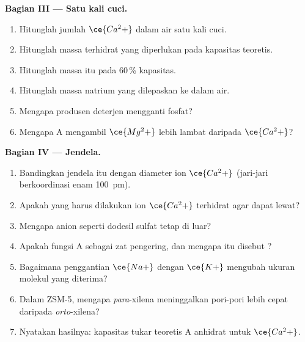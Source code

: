 \begin{problem}
\medskip\noindent\textbf{Bagian III --- Satu kali cuci.}
\begin{enumerate}[resume, beginpenalty=10000]
  \item Hitunglah jumlah $\ce{Ca^2+}$ dalam air satu kali cuci.
  \item Hitunglah massa  terhidrat yang diperlukan pada kapasitas teoretis.
  \item Hitunglah massa itu pada 60\,\% kapasitas.
  \item Hitunglah massa natrium yang dilepaskan ke dalam air.
  \item Mengapa produsen deterjen mengganti fosfat?
  \item Mengapa  A mengambil $\ce{Mg^2+}$ lebih lambat daripada $\ce{Ca^2+}$?
\end{enumerate}

\medskip\noindent\textbf{Bagian IV --- Jendela.}
\begin{enumerate}[resume, beginpenalty=10000]
  \item Bandingkan jendela itu dengan diameter ion $\ce{Ca^2+}$ (jari-jari berkoordinasi enam
        \qty{100}{pm}).
  \item Apakah yang harus dilakukan ion $\ce{Ca^2+}$ terhidrat agar dapat lewat?
  \item Mengapa anion  seperti dodesil sulfat tetap di luar?
  \item Apakah fungsi  A sebagai zat pengering, dan mengapa  itu disebut
        ?
  \item Bagaimana penggantian $\ce{Na+}$ dengan $\ce{K+}$ mengubah ukuran molekul yang diterima?
  \item Dalam ZSM-5, mengapa \textit{para}-xilena meninggalkan pori-pori lebih cepat daripada \textit{orto}-xilena?
  \item Nyatakan hasilnya: kapasitas tukar teoretis  A anhidrat
        untuk $\ce{Ca^2+}$.
\end{enumerate}
\end{problem}

